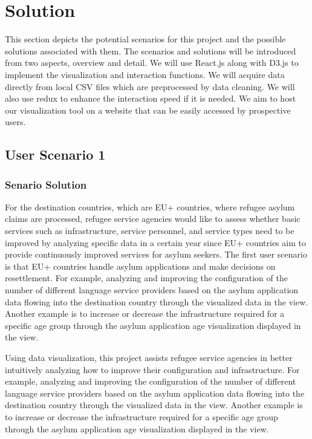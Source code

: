 \documentclass[journal]{vgtc}                %
\begin{document}
\section{Solution}

This section depicts the potential scenarios for this project and the possible solutions associated with them. The scenarios and solutions will be introduced from two aspects, overview and detail. We will use React.js along with D3.js to implement the visualization and interaction functions. We will acquire data directly from local CSV files which are preprocessed by data cleaning. We will also use redux to enhance the interaction speed if it is needed. We aim to host our visualization tool on a website that can be easily accessed by prospective users.

\subsection{User Scenario 1}
\subsubsection{Senario Solution}
For the destination countries, which are EU+ countries, where refugee asylum claims are processed, refugee service agencies would like to assess whether basic services such as infrastructure, service personnel, and service types need to be improved by analyzing specific data in a certain year since EU+ countries aim to provide continuously improved services for asylum seekers. The first user scenario is that EU+ countries handle asylum applications and make decisions on resettlement. For example, analyzing and improving the configuration of the number of different language service providers based on the asylum application data flowing into the destination country through the visualized data in the view. Another example is to increase or decrease the infrastructure required for a specific age group through the asylum application age visualization displayed in the view.

Using data visualization, this project assists refugee service agencies in better intuitively analyzing how to improve their configuration and infrastructure. For example, analyzing and improving the configuration of the number of different language service providers based on the asylum application data flowing into the destination country through the visualized data in the view. Another example is to increase or decrease the infrastructure required for a specific age group through the asylum application age visualization displayed in the view.
\end{document}
